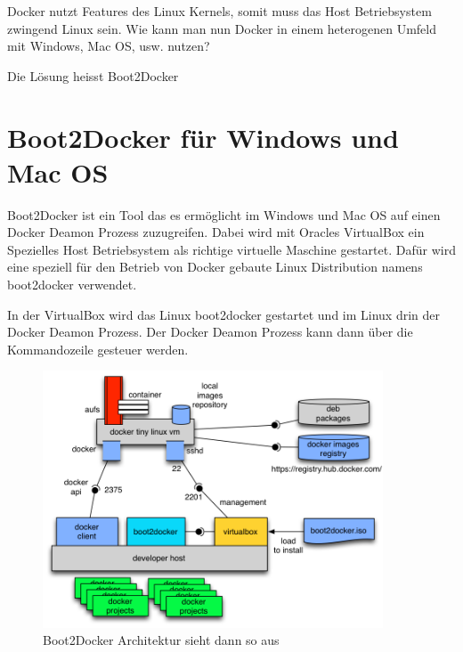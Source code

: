 Docker nutzt Features des Linux Kernels, somit muss das Host Betriebsystem zwingend
Linux sein. Wie kann man nun Docker in einem heterogenen Umfeld mit Windows, Mac OS, usw.
nutzen?

Die Lösung heisst Boot2Docker

\section{Boot2Docker für Windows und Mac OS}

Boot2Docker ist ein Tool das es ermöglicht im Windows und Mac OS auf einen Docker Deamon
Prozess zuzugreifen. Dabei wird mit Oracles VirtualBox ein Spezielles Host Betriebsystem
als richtige virtuelle Maschine gestartet. Dafür wird eine speziell für den Betrieb von
Docker gebaute Linux Distribution namens boot2docker verwendet.

In der VirtualBox wird das Linux boot2docker gestartet und im Linux drin der Docker Deamon
Prozess. Der Docker Deamon Prozess kann dann über die Kommandozeile gesteuer werden.
\\

\begin{figure}[htbp]
  \begin{center}
    \includegraphics[width=0.9\textwidth]{./images/boot2docker.png}
    \caption{Boot2Docker Architektur sieht dann so aus}
    \label{img:boot2docker}
  \end{center}
\end{figure}
